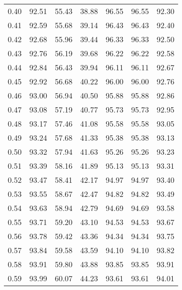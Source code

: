 \begin{tabular}{|c|c|c|c|c|c|c|}
      0.40 &     92.51 &     55.43 &      38.88 &   96.55 &      96.55 &         92.30 \\
      0.41 &     92.59 &     55.68 &      39.14 &   96.43 &      96.43 &         92.40 \\
      0.42 &     92.68 &     55.96 &      39.44 &   96.33 &      96.33 &         92.50 \\
      0.43 &     92.76 &     56.19 &      39.68 &   96.22 &      96.22 &         92.58 \\
      0.44 &     92.84 &     56.43 &      39.94 &   96.11 &      96.11 &         92.67 \\
      0.45 &     92.92 &     56.68 &      40.22 &   96.00 &      96.00 &         92.76 \\
      0.46 &     93.00 &     56.94 &      40.50 &   95.88 &      95.88 &         92.86 \\
      0.47 &     93.08 &     57.19 &      40.77 &   95.73 &      95.73 &         92.95 \\
      0.48 &     93.17 &     57.46 &      41.08 &   95.58 &      95.58 &         93.05 \\
      0.49 &     93.24 &     57.68 &      41.33 &   95.38 &      95.38 &         93.13 \\
      0.50 &     93.32 &     57.94 &      41.63 &   95.26 &      95.26 &         93.23 \\
      0.51 &     93.39 &     58.16 &      41.89 &   95.13 &      95.13 &         93.31 \\
      0.52 &     93.47 &     58.41 &      42.17 &   94.97 &      94.97 &         93.40 \\
      0.53 &     93.55 &     58.67 &      42.47 &   94.82 &      94.82 &         93.49 \\
      0.54 &     93.63 &     58.94 &      42.79 &   94.69 &      94.69 &         93.58 \\
      0.55 &     93.71 &     59.20 &      43.10 &   94.53 &      94.53 &         93.67 \\
      0.56 &     93.78 &     59.42 &      43.36 &   94.34 &      94.34 &         93.75 \\
      0.57 &     93.84 &     59.58 &      43.59 &   94.10 &      94.10 &         93.82 \\
      0.58 &     93.91 &     59.80 &      43.88 &   93.85 &      93.85 &         93.91 \\
      0.59 &     93.99 &     60.07 &      44.23 &   93.61 &      93.61 &         94.01 \\

\end{tabular}
